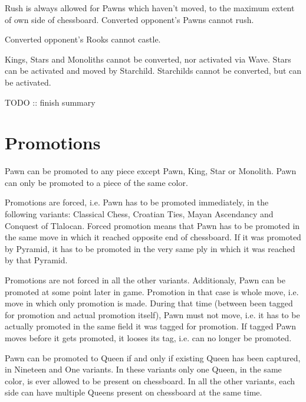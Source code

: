 Rush is always allowed for Pawns which haven't moved, to the maximum extent of
own side of chessboard. Converted opponent's Pawns cannot rush.

Converted opponent's Rooks cannot castle.

Kings, Stars and Monoliths cannot be converted, nor activated via Wave.
Stars can be activated and moved by Starchild.
Starchilds cannot be converted, but can be activated.

\huge{}
TODO :: finish summary
\normalsize{}

\section*{Promotions}
\label{sec:Definitions/Promotions}

Pawn can be promoted to any piece except Pawn, King, Star or Monolith.
Pawn can only be promoted to a piece of the same color.

Promotions are forced, i.e. Pawn has to be promoted immediately, in the following
variants: Classical Chess, Croatian Ties, Mayan Ascendancy and Conquest of Tlalocan.
Forced promotion means that Pawn has to be promoted in the same move in which it
reached opposite end of chessboard. If it was promoted by Pyramid, it has to be
promoted in the very same ply in which it was reached by that Pyramid.

Promotions are not forced in all the other variants. Additionaly, Pawn can be promoted
at some point later in game. Promotion in that case is whole move, i.e. move in which
only promotion is made. During that time (between been tagged for promotion and actual
promotion itself), Pawn must not move, i.e. it has to be actually promoted in the same
field it was tagged for promotion. If tagged Pawn moves before it gets promoted, it
looses its tag, i.e. can no longer be promoted.

Pawn can be promoted to Queen if and only if existing Queen has been captured, in
Nineteen and One variants. In these variants only one Queen, in the same color, is
ever allowed to be present on chessboard. In all the other variants, each side can
have multiple Queens present on chessboard at the same time.

\clearpage %
